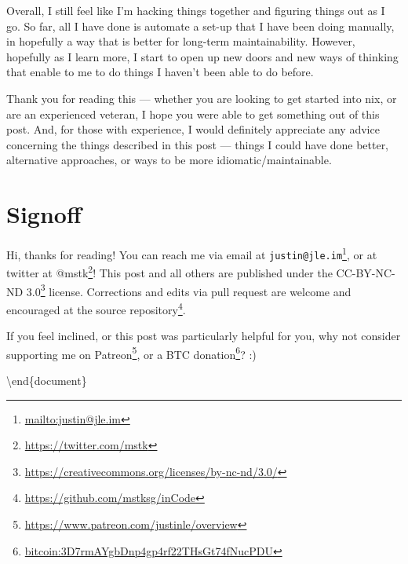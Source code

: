 \documentclass[]{article}
\renewcommand{\href}[2]{#2\footnote{\url{#1}}}
\begin{document}
Overall, I still feel like I'm hacking things together and figuring things out
as I go. So far, all I have done is automate a set-up that I have been doing
manually, in hopefully a way that is better for long-term maintainability.
However, hopefully as I learn more, I start to open up new doors and new ways of
thinking that enable to me to do things I haven't been able to do before.

Thank you for reading this --- whether you are looking to get started into nix,
or are an experienced veteran, I hope you were able to get something out of this
post. And, for those with experience, I would definitely appreciate any advice
concerning the things described in this post --- things I could have done
better, alternative approaches, or ways to be more idiomatic/maintainable.

\section{Signoff}\label{signoff}

Hi, thanks for reading! You can reach me via email at
\href{mailto:justin@jle.im}{\nolinkurl{justin@jle.im}}, or at twitter at
\href{https://twitter.com/mstk}{@mstk}! This post and all others are published
under the \href{https://creativecommons.org/licenses/by-nc-nd/3.0/}{CC-BY-NC-ND
3.0} license. Corrections and edits via pull request are welcome and encouraged
at \href{https://github.com/mstksg/inCode}{the source repository}.

If you feel inclined, or this post was particularly helpful for you, why not
consider \href{https://www.patreon.com/justinle/overview}{supporting me on
Patreon}, or a \href{bitcoin:3D7rmAYgbDnp4gp4rf22THsGt74fNucPDU}{BTC donation}?
:)

\textbackslash end\{document\}
\end{document}
